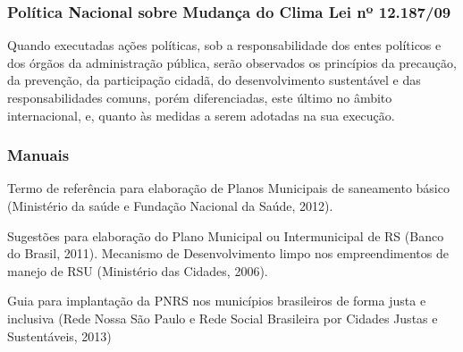 \begin{subapend}
\begin{subsubapend}
		\subsubsection{Política Nacional sobre Mudança do Clima Lei nº 12.187/09}
		Quando executadas ações políticas, sob a responsabilidade dos entes políticos e dos órgãos da administração pública, serão observados os princípios da precaução, da prevenção, da participação cidadã, do desenvolvimento sustentável e das responsabilidades comuns, porém diferenciadas, este último no âmbito internacional, e, quanto às medidas a serem adotadas na sua execução.
		\subsubsection{Manuais}
		Termo de referência para elaboração de Planos Municipais de saneamento básico (Ministério da saúde e Fundação Nacional da Saúde, 2012).
		
		Sugestões para elaboração do Plano Municipal ou Intermunicipal de RS (Banco do Brasil, 2011).
		Mecanismo de Desenvolvimento limpo nos empreendimentos de manejo de RSU (Ministério das Cidades, 2006).
		
		Guia para implantação da PNRS nos municípios brasileiros de forma justa e inclusiva (Rede Nossa São Paulo e Rede Social Brasileira por Cidades Justas e Sustentáveis, 2013)
	\end{subsubapend}
\end{subapend}

